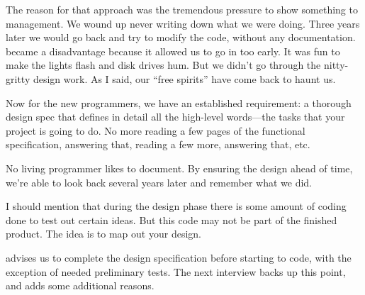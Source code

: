 \begin{interview}
\begin{tfquot}
The reason for that approach was the tremendous pressure to show
something to management. We wound up never writing down what we were
doing. Three years later we would go back and try to modify the code,
without any documentation. \Forth{} became a disadvantage because it
allowed us to go in too early. It was fun to make the lights flash and
disk drives hum. But we didn't go through the nitty-gritty design
work. As I said, our ``free spirits'' have come back to haunt us.

Now for the new programmers, we have an established requirement: a
thorough design spec that defines in detail all the high-level \Forth{}
words---the tasks that your project is going to do. No more reading a
few pages of the functional specification, answering that, reading a
few more, answering that, etc.

No living programmer likes to document. By ensuring the design ahead
of time, we're able to look back several years later and remember what
we did.

I should mention that during the design phase there is some amount of
coding done to test out certain ideas. But this code may not be part
of the finished product. The idea is to map out your design.
\end{tfquot}
\end{interview}%
 advises us to complete the design specification before starting
to code, with the exception of needed preliminary tests. The next
interview backs up this point, and adds some additional reasons.%
